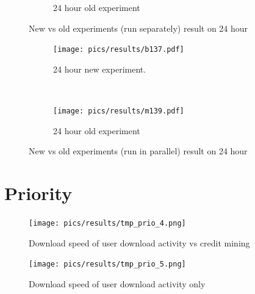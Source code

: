 \begin{figure}[h!]
\begin{adjustwidth}{-2.5cm}{}
\begin{subfigure}[t]{0.7\textwidth}
			\caption{24 hour old experiment}
		\end{subfigure}
		\caption{New vs old experiments (run separately) result on 24 hour}
	\end{adjustwidth}
\end{figure}

\begin{figure}[h!]
	\begin{adjustwidth}{-2.5cm}{}
		\begin{subfigure}[t]{0.7\textwidth}
			\centering
			\texttt{[image: pics/results/b137.pdf]}
			\caption{24 hour new experiment.}
		\end{subfigure}
		~
		\begin{subfigure}[t]{0.7\textwidth}
			\centering
			\texttt{[image: pics/results/m139.pdf]}
			\caption{24 hour old experiment}
		\end{subfigure}
		\caption{New vs old experiments (run in parallel) result on 24 hour}
	\end{adjustwidth}
\end{figure}
\clearpage
\section{Priority}
\begin{figure}[h]
	\centering
	\texttt{[image: pics/results/tmp\_prio\_4.png]}
	\caption{Download speed of user download activity vs credit mining}
	\label{fig:cmpriomeanagg}
\end{figure}
\begin{figure}[h]
	\centering
	\texttt{[image: pics/results/tmp\_prio\_5.png]}
	\caption{Download speed of user download activity only}
	\label{fig:cmpriomean}
\end{figure}

